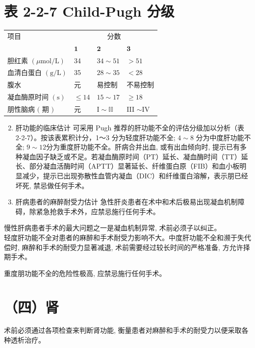 \documentclass[10pt]{article}
\begin{document}
\section*{表 2-2-7 Child-Pugh 分级}
\begin{center}
\begin{tabular}{llll}
\hline
项目 & \multicolumn{3}{c}{分数} \\
\cline { 2 - 4 }
 & $\mathbf{1}$ & $\mathbf{2}$ & $\mathbf{3}$ \\
\hline
胆红素 $(\mu \mathrm{mol} / \mathrm{L})$ & 34 & $34 \sim 51$ & $>51$ \\
血清白蛋白 $(\mathrm{g} / \mathrm{L})$ & 35 & $28 \sim 35$ & $<28$ \\
腹水 & 元 & 易控制 & 不易控制 \\
凝血酶原时间 $(\mathrm{s})$ & $\leqslant 14$ & $15 \sim 17$ & $\geqslant 18$ \\
朋性脑病 $($ 期 $)$ & 元 & $\mathrm{I} \sim \mathbb{I I}$ & III $\sim \mathrm{IV}$ \\
\hline
\end{tabular}
\end{center}

\begin{enumerate}
  \setcounter{enumi}{1}
  \item 肝功能的临床估计 可采用 Pugh 推荐的肝功能不全的评估分级加以分析（表 2-2-7）。按该表累积计分，1～3 分为轻度肝功能不全; $4 \sim 8$ 分为中度肝功能不全; $9 \sim 12$分为重度肝功能不全。肝病合并出血, 或有出血倾向时, 提示已有多种凝血因子缺乏或不足。若凝血酶原时间（PT）延长、凝血酶时间（TT）延长、部分凝血活酶时间（APTT）显著延长、纤维蛋白原（FIB）和血小板明显减少，提示已出现弥散性血管内凝血（DIC）和纤维蛋白溶解，表示朋已经坏死, 禁忌做任何手术。

  \item 肝病患者的麻醉耐受力估计 急性肝炎患者在术中和术后极易出现凝血机制障碍，除紧急抢救手术外，应禁忌施行任何手术。

\end{enumerate}

慢性肝病患者手术的最大问题之一是凝血机制异常, 术前必须子以纠正。\\
轻度肝功能不全对患者的麻醉和手术耐受力影响不大。中度肝功能不全和濒于失代偿时, 麻醉和手术的耐受力显著减退, 术前需要经过较长时间的严格准备, 方允许择期手术。

重度朋功能不全的危险性极高, 应禁忌施行任何手术。

\section*{（四）肾}
术前必须通过各项检查来判断肾功能, 衡量患者对麻醉和手术的耐受力以便采取各种透析治疗。
\end{document}
